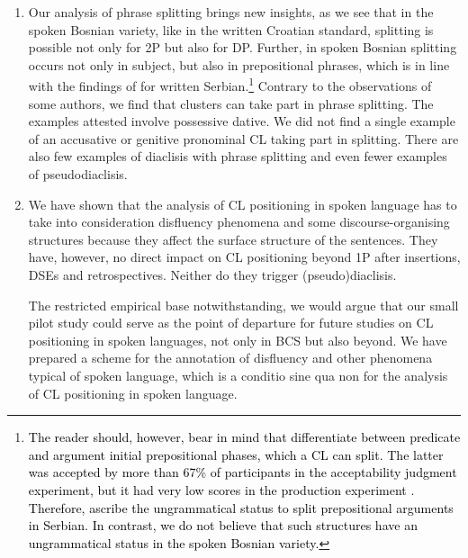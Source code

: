 \begin{enumerate}[label=A\arabic*:]
\item Our analysis of phrase splitting brings new insights, as we see that in the spoken Bosnian variety, like in the written Croatian standard, splitting is possible not only for 2P but also for DP. Further, in spoken Bosnian splitting occurs not only in subject, but also in prepositional phrases, which is in line with the findings of \citet{DiesingZec17} for written Serbian.\footnote{\textcolor{black}{The reader should, however, bear in mind that \citet[9f]{DiesingZec17} differentiate between predicate and argument initial prepositional phases, which a CL can split. The latter was accepted by more than 67\% of participants in the acceptability judgment experiment, but it had very low scores in the production experiment \citep[9f]{DiesingZec17}. Therefore, \citet[11f]{DiesingZec17} ascribe the ungrammatical status to split prepositional arguments in Serbian. In contrast, we do not believe that such structures have an ungrammatical status in the spoken Bosnian variety.}}   Contrary to the observations of some authors, we find that clusters can take part in phrase splitting. The examples attested involve possessive dative. We did not find a single example of an accusative or genitive pronominal CL taking part in splitting. There are also few examples of diaclisis with phrase splitting and even fewer examples of pseudodiaclisis. 

\item We have shown that the analysis of CL positioning in spoken language has to take into consideration disfluency phenomena and some discourse-organising structures because they affect the surface structure of the sentences. They have, however, no direct impact on CL positioning beyond 1P after insertions, DSEs and retrospectives. Neither do they trigger (pseudo)\-di\-a\-cli\-sis. 

The restricted empirical base notwithstanding, we would argue that our small pilot study could serve as the point of departure for future studies on CL positioning in spoken languages, not only in BCS but also beyond. We have prepared a scheme for the annotation of disfluency and other phenomena typical of spoken language, which is a conditio sine qua non for the analysis of CL positioning in spoken language. 
\end{enumerate}
